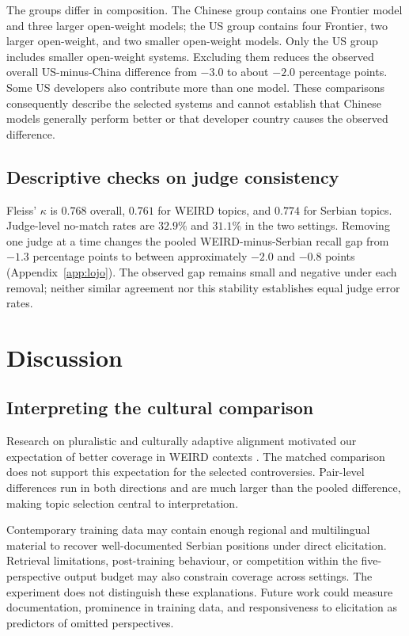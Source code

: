 \documentclass[11pt,a4paper]{article}
\begin{document}
The groups differ in composition. The Chinese group contains one Frontier model and three larger open-weight models; the US group contains four Frontier, two larger open-weight, and two smaller open-weight models. Only the US group includes smaller open-weight systems. Excluding them reduces the observed overall US-minus-China difference from $-3.0$ to about $-2.0$ percentage points. Some US developers also contribute more than one model. These comparisons consequently describe the selected systems and cannot establish that Chinese models generally perform better or that developer country causes the observed difference.

\subsection{Descriptive checks on judge consistency}
\label{sec:judge-checks}
Fleiss' $\kappa$ is $0.768$ overall, $0.761$ for WEIRD topics, and $0.774$ for Serbian topics. Judge-level no-match rates are $32.9\%$ and $31.1\%$ in the two settings. Removing one judge at a time changes the pooled WEIRD-minus-Serbian recall gap from $-1.3$ percentage points to between approximately $-2.0$ and $-0.8$ points (Appendix~\ref{app:lojo}). The observed gap remains small and negative under each removal; neither similar agreement nor this stability establishes equal judge error rates.

\section{Discussion}
\label{sec:Discussion}
\subsection{Interpreting the cultural comparison}
Research on pluralistic and culturally adaptive alignment motivated our expectation of better coverage in WEIRD contexts \citep{sorensenRoadmapPluralisticAlignment2024,fengModularPluralismPluralistic2024,wangMultilingualPromptingImproving2025}. The matched comparison does not support this expectation for the selected controversies. Pair-level differences run in both directions and are much larger than the pooled difference, making topic selection central to interpretation.

Contemporary training data may contain enough regional and multilingual material to recover well-documented Serbian positions under direct elicitation. Retrieval limitations, post-training behaviour, or competition within the five-perspective output budget may also constrain coverage across settings. The experiment does not distinguish these explanations. Future work could measure documentation, prominence in training data, and responsiveness to elicitation as predictors of omitted perspectives.
\end{document}
